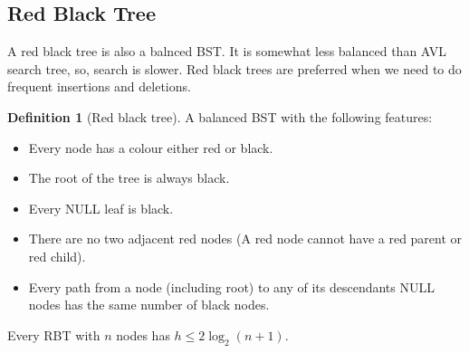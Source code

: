\documentclass[10pt, a4paper]{extarticle}
\theoremstyle{definition}
\newtheorem{defn}{Definition}
\begin{document}
\subsection{Red Black Tree}
A red black tree is also a balnced BST. It is somewhat less balanced than AVL search tree, so, search is slower. Red black trees are preferred when we need to do frequent insertions and deletions.
\begin{defn}[Red black tree]
	A balanced BST with the following features:
	\begin{itemize}
		\item Every node has a colour either red or black.
		\item The root of the tree is always black.
		\item Every NULL leaf is black.
		\item There are no two adjacent red nodes (A red node cannot have a red parent or red child).
		\item Every path from a node (including root) to any of its descendants NULL nodes has the same number of black nodes.
	\end{itemize}
	Every RBT with $n$ nodes has $h\leq 2\log_2(n+1)$.
\end{defn}
\end{document}
